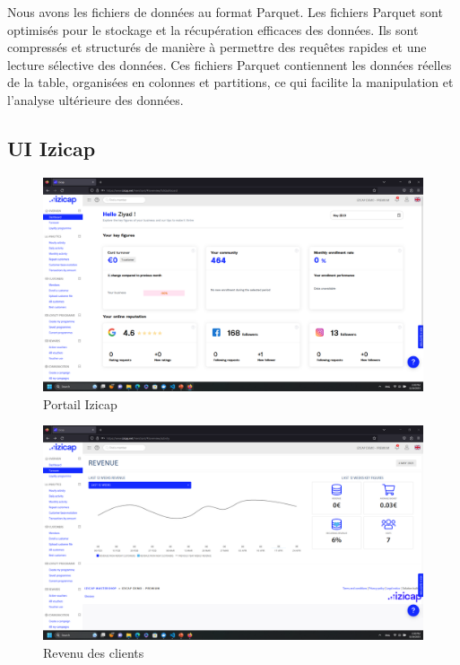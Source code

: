 Nous avons les fichiers de données au format Parquet. Les fichiers Parquet sont optimisés pour le stockage et la récupération efficaces des données. Ils sont compressés et structurés de manière à permettre des requêtes rapides et une lecture sélective des données. Ces fichiers Parquet contiennent les données réelles de la table, organisées en colonnes et partitions, ce qui facilite la manipulation et l'analyse ultérieure des données.    

\subsection{UI Izicap}

\begin{figure}[H]
\centering
\includegraphics[width=\linewidth]{images/izicap-portail.png}
\caption{Portail Izicap}\label{fig:izicap-1}
\end{figure}


\begin{figure}[H]
\centering
\includegraphics[width=\linewidth]{images/revenu.png}
\caption{Revenu des clients}\label{fig:izicap-2}
\end{figure}


